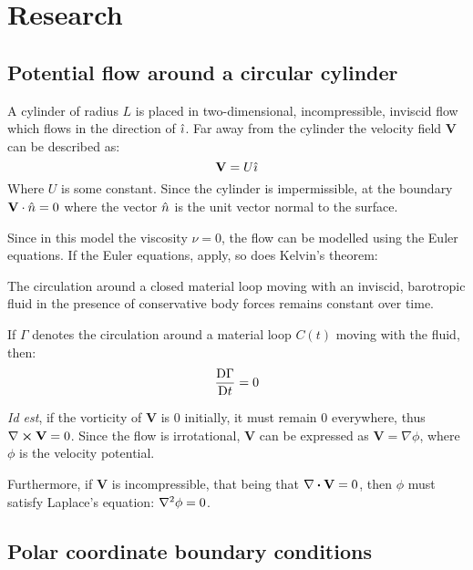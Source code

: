 \newpage
\section{Research}
\subsection{Potential flow around a circular cylinder}
A cylinder of radius $L$ is placed in two-dimensional, incompressible, inviscid flow which flows in the direction of $\hat{\imath}$.
Far away from the cylinder the velocity field $\mathbf{V}$ can be described as: 
\begin{equation}\label{equation:in-infinitum}
	\mathbf{V}=U\hat{\imath}
\end{equation}
Where $U$ is some constant. Since the cylinder is impermissible, at the boundary $\mathbf{V}\cdot\hat{n}=0$ where the vector $\hat{n}$ is the unit vector normal to the surface. 

Since in this model the viscosity $\nu=0$, the flow can be modelled using the Euler equations. If the Euler equations, apply, so does Kelvin's theorem:
\begin{theorem}\label{theorem:kelvin}
	The circulation around a closed material loop moving with an inviscid, barotropic fluid in the presence of conservative body forces remains constant over time.\needcitation
	
	If $\Gamma$ denotes the circulation around a material loop $C(t)$ moving with the fluid, then:
	$$\frac{\mathrm{D} \Gamma}{\mathrm{D} t}=0$$
\end{theorem}

\textit{Id est}, if the vorticity of $\mathbf{V}$ is $0$ initially, it must remain $0$ everywhere, thus $\curl\mathbf{V}=0$. Since the flow is irrotational, $\mathbf{V}$ can be expressed as $\mathbf{V}=\nabla\phi$, where $\phi$ is the velocity potential.

Furthermore, if $\mathbf{V}$ is incompressible, that being that $\divergence\mathbf{V}=0$, then $\phi$ must satisfy Laplace's equation: $\laplacian{\phi}=0$.

\subsection{Polar coordinate boundary conditions}
